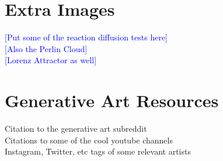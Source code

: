 \documentclass[12pt,twoside]{reedthesis}
\begin{document}
      \chapter{Extra Images}
      \textcolor{blue}{[Put some of the reaction diffusion tests here]}\\
      \textcolor{blue}{[Also the Perlin Cloud]}\\
      \textcolor{blue}{[Lorenz Attractor as well]}\\
      \chapter{Generative Art Resources}
      \label{Resources}
      Citation to the generative art subreddit\\
      Citations to some of the cool youtube channels\\
      Instagram, Twitter, etc tags of some relevant artists\\

\backmatter 


\nocite{*}
 
\end{document}
